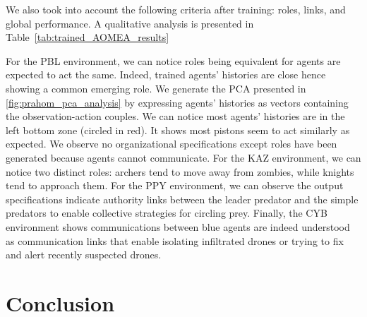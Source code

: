 \documentclass{ecai}
\begin{document}
We also took into account the following criteria after training: roles, links, and global performance. A qualitative analysis is presented in Table~\ref{tab:trained_AOMEA_results}
%

%
%
For the PBL environment, we can notice roles being equivalent for agents are expected to act the same. Indeed, trained agents' histories are close hence showing a common emerging role. We generate the PCA presented in \autoref{fig:prahom_pca_analysis} by expressing agents' histories as vectors containing the observation-action couples. We can notice most agents’ histories are in the left bottom zone (circled in red). It shows most pistons seem to act similarly as expected. We observe no organizational specifications except roles have been generated because agents cannot communicate. For the KAZ environment, we can notice two distinct roles: archers tend to move away from zombies, while knights tend to approach them. For the PPY environment, we can observe the output specifications indicate authority links between the leader predator and the simple predators to enable collective strategies for circling prey. Finally, the CYB environment shows communications between blue agents are indeed understood as communication links that enable isolating infiltrated drones or trying to fix and alert recently suspected drones.

\section{Conclusion}



\end{document}
